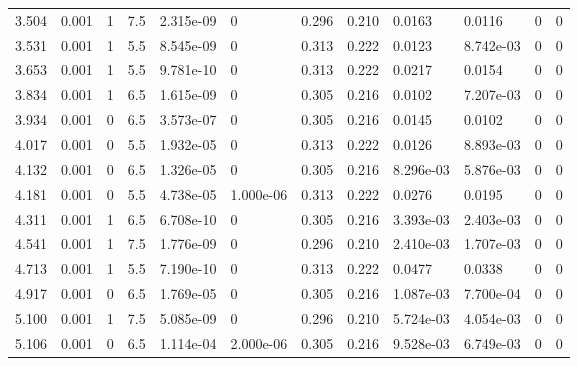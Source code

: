 \documentclass[preview]{standalone}
\begin{document}
{{\begin{tabular}{L{1.2cm}C{1.2cm} C{0.3cm}C{0.5cm} C{1.4cm}C{1.4cm} C{1.4cm}C{1.4cm} C{1.6cm}C{1.6cm} C{1.6cm}C{1.6cm}}
  3.504  &  0.001  & 1     & 7.5 &  2.315e-09  & 0  &  0.296&   0.210& 0.0163 & 0.0116   &  0 & 0  \\ 
  3.531  &  0.001  & 1     & 5.5 &  8.545e-09  & 0  &  0.313&   0.222& 0.0123 & 8.742e-03   &  0 & 0  \\ 
  3.653  &  0.001  & 1     & 5.5 &  9.781e-10  & 0  &  0.313&   0.222& 0.0217 & 0.0154   &  0 & 0  \\ 
  3.834  &  0.001  & 1     & 6.5 &  1.615e-09  & 0  &  0.305&   0.216& 0.0102 & 7.207e-03   &  0 & 0  \\ 
  3.934  &  0.001  & 0     & 6.5 &  3.573e-07  & 0  &  0.305&   0.216& 0.0145 & 0.0102   &  0 & 0  \\ 
  4.017  &  0.001  & 0     & 5.5 &  1.932e-05  & 0  &  0.313&   0.222& 0.0126 & 8.893e-03   &  0 & 0  \\ 
  4.132  &  0.001  & 0     & 6.5 &  1.326e-05  & 0  &  0.305&   0.216& 8.296e-03 & 5.876e-03   &  0 & 0  \\ 
  4.181  &  0.001  & 0     & 5.5 &  4.738e-05  & 1.000e-06  &  0.313&   0.222& 0.0276 & 0.0195   &  0 & 0  \\ 
  4.311  &  0.001  & 1     & 6.5 &  6.708e-10  & 0  &  0.305&   0.216& 3.393e-03 & 2.403e-03   &  0 & 0  \\ 
  4.541  &  0.001  & 1     & 7.5 &  1.776e-09  & 0  &  0.296&   0.210& 2.410e-03 & 1.707e-03   &  0 & 0  \\ 
  4.713  &  0.001  & 1     & 5.5 &  7.190e-10  & 0  &  0.313&   0.222& 0.0477 & 0.0338   &  0 & 0  \\ 
  4.917  &  0.001  & 0     & 6.5 &  1.769e-05  & 0  &  0.305&   0.216& 1.087e-03 & 7.700e-04   &  0 & 0  \\ 
  5.100  &  0.001  & 1     & 7.5 &  5.085e-09  & 0  &  0.296&   0.210& 5.724e-03 & 4.054e-03   &  0 & 0  \\ 
  5.106  &  0.001  & 0     & 6.5 &  1.114e-04  & 2.000e-06  &  0.305&   0.216& 9.528e-03 & 6.749e-03   &  0 & 0  \\ 
\hline 
\end{tabular} 

}}
\end{document}
